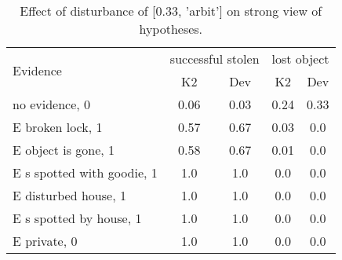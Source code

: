 \begin{table}\begin{tabular}{l|cc|cc}\toprule\multirow{2}{*}{Evidence} & \multicolumn{2}{c}{successful stolen}& \multicolumn{2}{c}{lost object}\\& {K2} & {Dev}& {K2} & {Dev}\\\midrule
no evidence, 0 & 0.06&0.03&\cellcolor{Bittersweet}0.24&\cellcolor{Bittersweet}0.33\\E broken lock, 1 & \cellcolor{Bittersweet}0.57&\cellcolor{Bittersweet}0.67&0.03&0.0\\E object is gone, 1 & \cellcolor{Bittersweet}0.58&\cellcolor{Bittersweet}0.67&0.01&0.0\\E s spotted with goodie, 1 & 1.0&1.0&0.0&0.0\\E disturbed house, 1 & 1.0&1.0&0.0&0.0\\E s spotted by house, 1 & 1.0&1.0&0.0&0.0\\E private, 0 & 1.0&1.0&0.0&0.0\\\bottomrule\end{tabular}\caption{Effect of disturbance of [0.33, 'arbit'] on strong view of hypotheses.}\end{table}